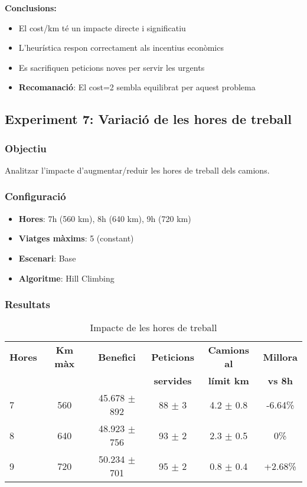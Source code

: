 \textbf{Conclusions:}
\begin{itemize}
    \item El cost/km té un impacte directe i significatiu
    \item L'heurística respon correctament als incentius econòmics
    \item Es sacrifiquen peticions noves per servir les urgents
    \item \textbf{Recomanació}: El cost=2 sembla equilibrat per aquest problema
\end{itemize}

\subsection{Experiment 7: Variació de les hores de treball}

\subsubsection{Objectiu}
Analitzar l'impacte d'augmentar/reduir les hores de treball dels camions.

\subsubsection{Configuració}
\begin{itemize}
    \item \textbf{Hores}: 7h (560 km), 8h (640 km), 9h (720 km)
    \item \textbf{Viatges màxims}: 5 (constant)
    \item \textbf{Escenari}: Base
    \item \textbf{Algoritme}: Hill Climbing
\end{itemize}

\subsubsection{Resultats}

\begin{table}[H]
\centering
\begin{tabular}{@{}lccccc@{}}
\toprule
\textbf{Hores} & \textbf{Km màx} & \textbf{Benefici} & \textbf{Peticions} & \textbf{Camions al} & \textbf{Millora} \\
 & & & \textbf{servides} & \textbf{límit km} & \textbf{vs 8h} \\
\midrule
7 & 560 & 45.678 $\pm$ 892 & 88 $\pm$ 3 & 4.2 $\pm$ 0.8 & -6.64\% \\
8 & 640 & 48.923 $\pm$ 756 & 93 $\pm$ 2 & 2.3 $\pm$ 0.5 & 0\% \\
9 & 720 & 50.234 $\pm$ 701 & 95 $\pm$ 2 & 0.8 $\pm$ 0.4 & +2.68\% \\
\bottomrule
\end{tabular}
\caption{Impacte de les hores de treball}
\label{tab:exp7-hores}
\end{table}

